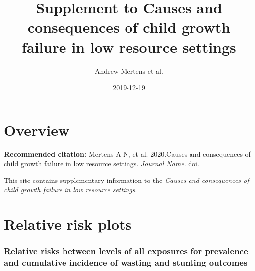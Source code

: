 \documentclass[9pt,]{book}
\title{Supplement to Causes and consequences of child growth failure in low
resource settings}
\author{Andrew Mertens et al.}
\date{2019-12-19}
\begin{document}
\maketitle

{
\setcounter{tocdepth}{1}
\tableofcontents
}
\chapter{Overview}\label{overview}

\textbf{Recommended citation:} Mertens A N, et al. 2020.Causes and
consequences of child growth failure in low resource settings.
\emph{Journal Name}. doi.

This site contains supplementary information to the \emph{Causes and
consequences of child growth failure in low resource settings}.

\chapter{Relative risk plots}\label{RR}

\raggedright

\subsection{Relative risks between levels of all exposures for
prevalence and cumulative incidence of wasting and stunting
outcomes}\label{relative-risks-between-levels-of-all-exposures-for-prevalence-and-cumulative-incidence-of-wasting-and-stunting-outcomes}
\end{document}

